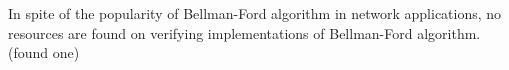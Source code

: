 In spite of the popularity of Bellman-Ford algorithm in network applications, no resources are found on verifying implementations of Bellman-Ford algorithm.(found one)

